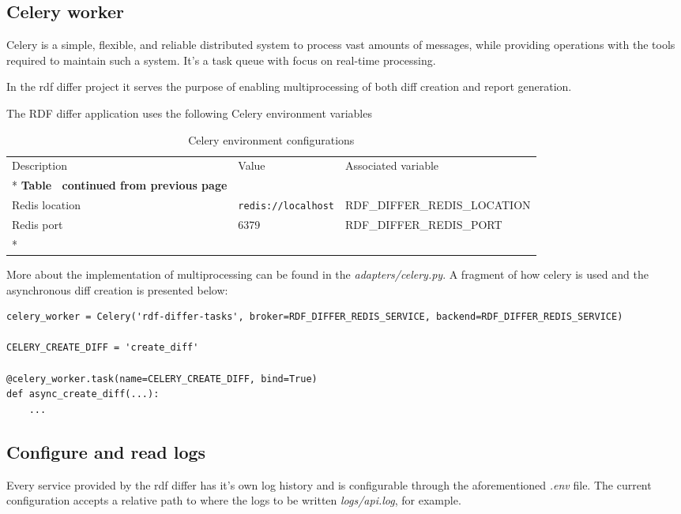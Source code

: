 \subsection{Celery worker}
Celery is a simple, flexible, and reliable distributed system to process vast amounts of messages, while providing operations with the tools required to maintain such a system. It’s a task queue with focus on real-time processing.

In the rdf differ project it serves the purpose of enabling multiprocessing of both diff creation and report generation.

The RDF differ application uses the following Celery environment variables

\begin{longtable}[c]{@{}p{3.5cm}p{3.5cm}l@{}}
	\toprule
	Description    & Value                      & Associated variable          \\* \midrule
	\endfirsthead
	\multicolumn{3}{c}%
	{{\bfseries Table \thetable\ continued from previous page}}                \\
	\endhead
	\bottomrule
	\endfoot
	\endlastfoot
	Redis location & \texttt{redis://localhost} & RDF\_DIFFER\_REDIS\_LOCATION \\
	Redis port     & 6379                       & RDF\_DIFFER\_REDIS\_PORT     \\*\bottomrule
	\caption{Celery environment configurations}
	\label{tab:celery-env}                                                     \\
\end{longtable}

More about the implementation of multiprocessing can be found in the \textit{adapters/celery.py}. A fragment of how celery is used and the asynchronous diff creation is presented below:

\begin{lstlisting}
celery_worker = Celery('rdf-differ-tasks', broker=RDF_DIFFER_REDIS_SERVICE, backend=RDF_DIFFER_REDIS_SERVICE)

CELERY_CREATE_DIFF = 'create_diff'

@celery_worker.task(name=CELERY_CREATE_DIFF, bind=True)
def async_create_diff(...):
	...
\end{lstlisting}

\subsection{Configure and read logs}
Every service provided by the rdf differ has it's own log history and is configurable through the aforementioned \textit{.env} file. The current configuration accepts a relative path to where the logs to be written \textit{logs/api.log}, for example.

